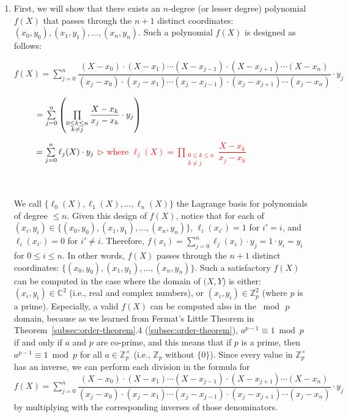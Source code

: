 \begin{myproof}
\begin{enumerate}


\item First, we will show that there exists an $n$-degree (or lesser degree) polynomial $f(X)$ that passes through the $n+1$ distinct coordinates: $(x_0, y_0), (x_1, y_1), \ldots, (x_n, y_n)$. Such a polynomial $f(X)$ is designed as follows:

$f(X) = \sum\limits_{j=0}^{n}\dfrac{(X-x_0)\cdot(X-x_1)\cdots(X-x_{j-1})\cdot(X-x_{j+1})\cdots(X-x_{n})}{(x_j-x_0)\cdot(x_j-x_1)\cdots(x_j-x_{j-1})\cdot(x_j-x_{j+1})\cdots(x_j-x_{n})}\cdot y_j$

$ \textcolor{white}{f(X) }= \sum\limits_{j=0}^{n} \left( \prod\limits_{\substack{0 \le k \le n\\ k \ne j}} \dfrac{X - x_k}{x_j - x_k} \cdot y_j\right)$

$ \textcolor{white}{f(X) }= \sum\limits_{j=0}^{n} \ell_j(X) \cdot y_j$ \textcolor{red}{ $\rhd$ where $\ell_j(X) =  \prod\limits_{\substack{0 \le k \le n\\ k \ne j}} \dfrac{X - x_k}{x_j - x_k}$}

$ $

We call $\{\ell_0(X), \ell_1(X), \ldots, \ell_{n}(X) \}$ the Lagrange basis for polynomials of degree $\leq n$. Given this design of $f(X)$, notice that for each of $(x_i, y_i) \in \{(x_0, y_0), (x_1, y_1), \ldots, (x_n, y_n)\}$, \text{ } $\ell_i(x_{i'}) = 1$ for $i' = i$, and $\ell_i(x_{i'}) = 0$ for $i' \neq i$. Therefore, $f(x_i) = \sum\limits_{j=0}^{n} \ell_j(x_i) \cdot y_j = 1 \cdot y_i = y_i$ for $0 \leq i \leq n$. In other words, $f(X)$ passes through the $n+1$ distinct coordinates: $\{(x_0, y_0), (x_1, y_1), \ldots, (x_n, y_n)\}$. Such a satisfactory $f(X)$ can be computed in the case where the domain of $(X, Y$) is either: $(x_i, y_i) \in \mathbb{C}^2$ (i.e., real and complex numbers), or $(x_i, y_i) \in \mathbb{Z}_p^2$ (where $p$ is a prime). Especially, a valid $f(X)$ can be computed also in the $\bmod \, p$ domain, because as we learned from Fermat's Little Theorem in Theorem~\ref*{subsec:order-theorem}.4 (\autoref{subsec:order-theorem}), $a^{p - 1} \equiv 1 \bmod p$ if and only if $a$ and $p$ are co-prime, and this means that if $p$ is a prime, then $a^{p - 1} \equiv 1 \bmod p$ for all $a \in \mathbb{Z}_p^{\times}$ (i.e., $\mathbb{Z}_p$ without $\{0\}$). Since every value in $\mathbb{Z}_p^{\times}$ has an inverse, 
we can perform each division in the formula for $f(X) = \sum\limits_{j=0}^{n}\dfrac{(X-x_0)\cdot(X-x_1)\cdots(X-x_{j-1})\cdot(X-x_{j+1})\cdots(X-x_{n})}{(x_j-x_0)\cdot(x_j-x_1)\cdots(x_j-x_{j-1})\cdot(x_j-x_{j+1})\cdots(x_j-x_{n})}\cdot y_j$ by multiplying with the corresponding inverses of those denominators.
 

\end{enumerate}
\end{myproof}
